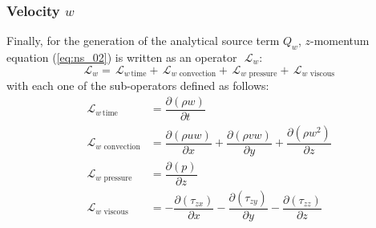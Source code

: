 \documentclass[10pt]{article}
\newcommand{\Diff}[2] {\dfrac{\partial( #1)}{\partial #2}}
\newcommand{\Lo}{\,\mathcal{L}}
\newcommand{\convection}{\,\text{convection}}
\newcommand{\viscous}{\,\text{viscous}}
\newcommand{\pressure}{\,\text{pressure}}
\begin{document}
\subsubsection{Velocity $w $}
Finally, for the generation of the analytical source term $Q_w $, $z$-momentum equation (\ref{eq:ns_02}) is written as an operator~$\Lo_w $:
 $$\Lo_w  = \Lo_{w  \, \text{time}}+\Lo_{w  \, \convection}+\Lo_{w  \, \pressure }+\Lo_{w  \, \viscous }$$
with each one of the sub-operators defined as follows:
\begin{equation*}
 \begin{split}
\Lo_{w  \, \text{time}}&= \Diff{\rho w }{t} \\
\Lo_{w  \, \convection}&= \Diff{\rho  uw }{ x}+\Diff{\rho  vw }{ y}+\Diff{\rho w^2 }{ z}\\
\Lo_{w  \, \pressure }&= \Diff{p}{z}\\
\Lo_{w  \, \viscous }&= -\Diff{\tau_{zx}}{x}-\Diff{\tau_{zy}}{y}-\Diff{\tau_{zz}}{z}
 \end{split}
\end{equation*}
\end{document}
